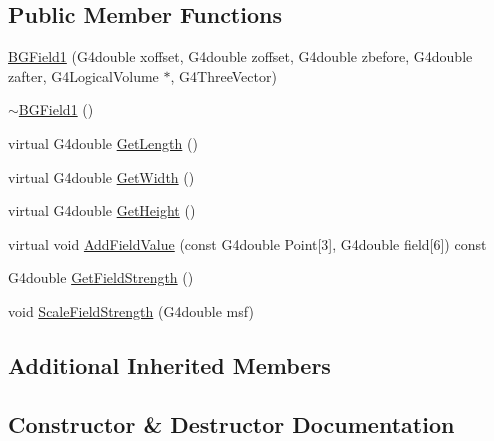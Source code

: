\subsection*{Public Member Functions}
\begin{DoxyCompactItemize}
\item 
\hyperlink{classBGField1_a1bc9224e371e4e289fb1104303a5e336}{B\+G\+Field1} (G4double xoffset, G4double zoffset, G4double zbefore, G4double zafter, G4\+Logical\+Volume $\ast$, G4\+Three\+Vector)
\item 
\hyperlink{classBGField1_a9f32073e612f55662a302942f5015177}{$\sim$\+B\+G\+Field1} ()
\item 
virtual G4double \hyperlink{classBGField1_a11ba0cbb1190e5f2340aa7907f7d66f9}{Get\+Length} ()
\item 
virtual G4double \hyperlink{classBGField1_a44eca4d023aac7e4bf9dd959760afa28}{Get\+Width} ()
\item 
virtual G4double \hyperlink{classBGField1_af1b93a1566b1a53a00eb1d3ccc77815a}{Get\+Height} ()
\item 
virtual void \hyperlink{classBGField1_aa6119f980c4bb2eb52067c1e66ffbae4}{Add\+Field\+Value} (const G4double Point\mbox{[}3\mbox{]}, G4double field\mbox{[}6\mbox{]}) const 
\item 
G4double \hyperlink{classBGField1_a105ef833b5e57d8624536ba7fcf4e382}{Get\+Field\+Strength} ()
\item 
void \hyperlink{classBGField1_ab0123f55a83d4a8a4c17b401478759a0}{Scale\+Field\+Strength} (G4double msf)
\end{DoxyCompactItemize}
\subsection*{Additional Inherited Members}


\subsection{Constructor \& Destructor Documentation}
